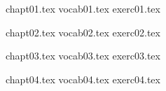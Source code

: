 \documentclass[12pt]{book}
\begin{document}
%
%
%

{chapt01.tex}
{vocab01.tex}
{exerc01.tex}

{chapt02.tex}
{vocab02.tex}
{exerc02.tex}

{chapt03.tex}
{vocab03.tex}
{exerc03.tex}


{chapt04.tex}
{vocab04.tex}
{exerc04.tex}

%
%
%
%
%
%
%
%
%
%
%
%
%
%
%
%
%
%
%
%
\end{document}
